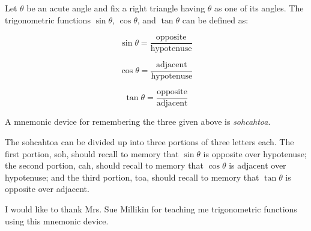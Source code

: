 \documentclass[12pt]{article}
\begin{document}
Let $\theta$ be an acute angle and fix a right triangle having $\theta$ as one of its angles. The trigonometric functions $\sin \theta$, $\cos \theta$, and $\tan \theta$ can be defined as:

$$\sin \theta = \frac{\text{opposite}}{\text{hypotenuse}}$$

$$\cos \theta = \frac{\text{adjacent}}{\text{hypotenuse}}$$

$$\tan \theta = \frac{\text{opposite}}{\text{adjacent}}$$

A mnemonic device for remembering the three  given above is {\sl sohcahtoa\/}.

The  sohcahtoa can be divided up into three portions of three letters each.  The first portion, soh, should recall to memory that $\sin \theta$ is opposite over hypotenuse; the second portion, cah, should recall to memory that $\cos \theta$ is adjacent over hypotenuse; and the third portion, toa, should recall to memory that $\tan \theta$ is opposite over adjacent.

I would like to thank Mrs. Sue Millikin for teaching me trigonometric functions using this mnemonic device.
\end{document}
